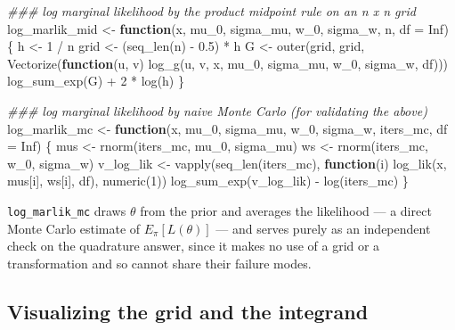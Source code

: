 \documentclass[
  letterpaper,
  DIV=11,
  numbers=noendperiod]{scrreprt}
\newenvironment{Shaded}{\begin{snugshade}}{\end{snugshade}}
\newcommand{\AttributeTok}[1]{\textcolor[rgb]{0.40,0.45,0.13}{#1}}
\newcommand{\ConstantTok}[1]{\textcolor[rgb]{0.56,0.35,0.01}{#1}}
\newcommand{\ControlFlowTok}[1]{\textcolor[rgb]{0.00,0.23,0.31}{\textbf{#1}}}
\newcommand{\DecValTok}[1]{\textcolor[rgb]{0.68,0.00,0.00}{#1}}
\newcommand{\DocumentationTok}[1]{\textcolor[rgb]{0.37,0.37,0.37}{\textit{#1}}}
\newcommand{\FloatTok}[1]{\textcolor[rgb]{0.68,0.00,0.00}{#1}}
\newcommand{\FunctionTok}[1]{\textcolor[rgb]{0.28,0.35,0.67}{#1}}
\newcommand{\NormalTok}[1]{\textcolor[rgb]{0.00,0.23,0.31}{#1}}
\newcommand{\OtherTok}[1]{\textcolor[rgb]{0.00,0.23,0.31}{#1}}
\newcommand{\SpecialCharTok}[1]{\textcolor[rgb]{0.37,0.37,0.37}{#1}}
\begin{document}
\begin{Shaded}
\begin{Highlighting}[]
\DocumentationTok{\#\#\# log marginal likelihood by the product midpoint rule on an n x n grid}
\NormalTok{log\_marlik\_mid }\OtherTok{\textless{}{-}} \ControlFlowTok{function}\NormalTok{(x, mu\_0, sigma\_mu, w\_0, sigma\_w, n, }\AttributeTok{df =} \ConstantTok{Inf}\NormalTok{) \{}
\NormalTok{    h }\OtherTok{\textless{}{-}} \DecValTok{1} \SpecialCharTok{/}\NormalTok{ n}
\NormalTok{    grid }\OtherTok{\textless{}{-}}\NormalTok{ (}\FunctionTok{seq\_len}\NormalTok{(n) }\SpecialCharTok{{-}} \FloatTok{0.5}\NormalTok{) }\SpecialCharTok{*}\NormalTok{ h}
\NormalTok{    G }\OtherTok{\textless{}{-}} \FunctionTok{outer}\NormalTok{(grid, grid, }\FunctionTok{Vectorize}\NormalTok{(}\ControlFlowTok{function}\NormalTok{(u, v)}
        \FunctionTok{log\_g}\NormalTok{(u, v, x, mu\_0, sigma\_mu, w\_0, sigma\_w, df)))}
    \FunctionTok{log\_sum\_exp}\NormalTok{(G) }\SpecialCharTok{+} \DecValTok{2} \SpecialCharTok{*} \FunctionTok{log}\NormalTok{(h)}
\NormalTok{\}}

\DocumentationTok{\#\#\# log marginal likelihood by naive Monte Carlo (for validating the above)}
\NormalTok{log\_marlik\_mc }\OtherTok{\textless{}{-}} \ControlFlowTok{function}\NormalTok{(x, mu\_0, sigma\_mu, w\_0, sigma\_w, iters\_mc, }\AttributeTok{df =} \ConstantTok{Inf}\NormalTok{) \{}
\NormalTok{    mus }\OtherTok{\textless{}{-}} \FunctionTok{rnorm}\NormalTok{(iters\_mc, mu\_0, sigma\_mu)}
\NormalTok{    ws  }\OtherTok{\textless{}{-}} \FunctionTok{rnorm}\NormalTok{(iters\_mc, w\_0, sigma\_w)}
\NormalTok{    v\_log\_lik }\OtherTok{\textless{}{-}} \FunctionTok{vapply}\NormalTok{(}\FunctionTok{seq\_len}\NormalTok{(iters\_mc), }\ControlFlowTok{function}\NormalTok{(i) }\FunctionTok{log\_lik}\NormalTok{(x, mus[i], ws[i], df), }\FunctionTok{numeric}\NormalTok{(}\DecValTok{1}\NormalTok{))}
    \FunctionTok{log\_sum\_exp}\NormalTok{(v\_log\_lik) }\SpecialCharTok{{-}} \FunctionTok{log}\NormalTok{(iters\_mc)}
\NormalTok{\}}
\end{Highlighting}
\end{Shaded}

\texttt{log\_marlik\_mc} draws \(\theta\) from the prior and averages
the likelihood --- a direct Monte Carlo estimate of \(E_\pi[L(\theta)]\)
--- and serves purely as an independent check on the quadrature answer,
since it makes no use of a grid or a transformation and so cannot share
their failure modes.

\subsection{Visualizing the grid and the
integrand}\label{visualizing-the-grid-and-the-integrand}
\end{document}
